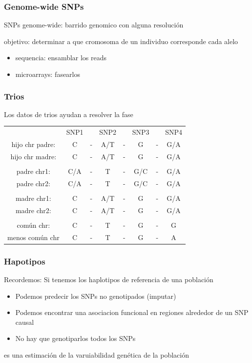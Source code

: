 \documentclass{beamer}\usepackage[]{graphicx}\usepackage[]{color}
\begin{document}
\begin{frame}[fragile]
\frametitle{Genome-wide SNPs}
SNPs genome-wide: barrido genomico con alguna resoluci\'on

objetivo: determinar a que cromosoma de un individuo corresponde cada alelo

\begin{itemize}
\item sequencia: ensamblar los reads
\item microarrays: fasearlos 
\end{itemize}
\end{frame}


\begin{frame}[fragile]
\frametitle{Trios}
Los datos de trios ayudan a resolver la fase
\begin{table}[]
\centering
\begin{tabular}{cccccccc}
      &SNP1& &SNP2 & & SNP3 &  & SNP4\\
hijo chr padre: &C   &-&  A/T&-& G &-& G/A\\
hijo chr madre: &C   &-&  A/T&-& G &-& G/A\\ 
& & & &\\
padre chr1: &C/A   &-&  T&-& G/C &-& G/A\\
padre chr2: &C/A   &-&  T&-& G/C &-& G/A\\ 
& & & &\\
madre chr1: &C   &-&  A/T&-& G &-& G/A \\
madre chr2: &C   &-&  A/T&-& G &-& G/A\\ 
& & & &\\
com\'un chr: & C  &-&  T &-& G &-& G\\
menos com\'un chr & C  &-&  T &-& G &-& A\\
\end{tabular}
\end{table}
\end{frame}


\begin{frame}[fragile]
\frametitle{Hapotipos}

Recordemos: Si tenemos los haplotipos de referencia de una poblaci\'on
\begin{itemize}
\item Podemos predecir los SNPs no genotipados (imputar)
\item Podemos encontrar una asociacion funcional en regiones alrededor de un SNP causal
\item No hay que genotiparlos todos los SNPs
\end{itemize}
es una estimaci\'on de la varuiabilidad gen\'etica de la poblaci\'on

\end{frame}
\end{document}
